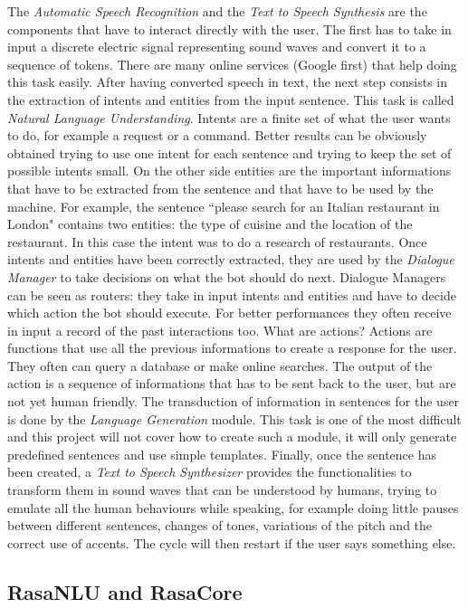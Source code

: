 \documentclass[11pt,a4paper]{article}
\begin{document}
The \textit{Automatic Speech Recognition} and the \textit{Text to Speech Synthesis} are the components that have to interact directly with the user. The first has to take in input a discrete electric signal representing sound waves and convert it to a sequence of tokens. There are many online services (Google first) that help doing this task easily.
After having converted speech in text, the next step consists in the extraction of intents and entities from the input sentence. This task is called \textit{Natural Language Understanding}. Intents are a finite set of what the user wants to do, for example a request or a command. Better results can be obviously obtained trying to use one intent for each sentence and trying to keep the set of possible intents small. On the other side entities are the important informations that have to be extracted from the sentence and that have to be used by the machine. For example, the sentence ``please search for an Italian restaurant in London" contains two entities: the type of cuisine and the location of the restaurant. In this case the intent was to do a research of restaurants.
Once intents and entities have been correctly extracted, they are used by the \textit{Dialogue Manager} to take decisions on what the bot should do next. Dialogue Managers can be seen as routers: they take in input intents and entities and have to decide which action the bot should execute. For better performances they often receive in input a record of the past interactions too. What are actions? Actions are functions that use all the previous informations to create a response for the user. They often can query a database or make online searches. The output of the action is a sequence of informations that has to be sent back to the user, but are not yet human friendly. The transduction of information in sentences for the user is done by the \textit{Language Generation} module. This task is one of the most difficult and this project will not cover how to create such a module, it will only generate predefined sentences and use simple templates.
Finally, once the sentence has been created, a \textit{Text to Speech Synthesizer} provides the functionalities to transform them in sound waves that can be understood by humans, trying to emulate all the human behaviours while speaking, for example doing little pauses between different sentences, changes of tones, variations of the pitch and the correct use of accents. The cycle will then restart if the user says something else.
 
\subsection{RasaNLU and RasaCore}
\end{document}
